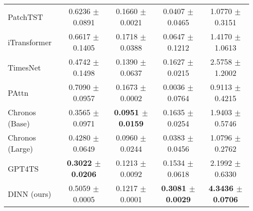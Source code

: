 {\begin{tabular}{lcccc}
PatchTST                             & 0.6236 $\pm$ 0.0891         & 0.1660 $\pm$ 0.0021         & 0.0407 $\pm$ 0.0465       & 1.0770 $\pm$ 0.3151          \\
iTransformer                         & 0.6617 $\pm$ 0.1405         & 0.1718 $\pm$ 0.0388         & 0.0647 $\pm$ 0.1212       & 1.4170 $\pm$ 1.0613          \\
TimesNet                             & 0.4742 $\pm$ 0.1498         & 0.1390 $\pm$ 0.0637         & 0.1627 $\pm$ 0.0215       & 2.5758 $\pm$ 1.2002          \\
PAttn                                & 0.7090 $\pm$ 0.0957         & 0.1673 $\pm$ 0.0002         & 0.0036 $\pm$ 0.0764       & 0.9113 $\pm$ 0.4215          \\
Chronos (Base)                       & 0.3565 $\pm$ 0.0971         & \textbf{0.0951 $\pm$ 0.0159}         & 0.1635 $\pm$ 0.0254       & 1.9403 $\pm$ 0.5746          \\
Chronos (Large)                      & 0.4280 $\pm$ 0.0649         & 0.0960 $\pm$ 0.0244         & 0.0383 $\pm$ 0.0456       & 1.0796 $\pm$ 0.2762          \\
GPT4TS                               & \textbf{0.3022 $\pm$ 0.0206}         & 0.1213 $\pm$ 0.0092         & 0.1534 $\pm$ 0.0618       & 2.1992 $\pm$ 0.6330          \\
DINN (ours)                          & 0.5059 $\pm$ \color[HTML]{00009B} 0.0005         & 0.1217 $\pm$ \color[HTML]{00009B} 0.0001         & \textbf{0.3081 $\pm$ \color[HTML]{00009B} 0.0029}       & \textbf{4.3436 $\pm$ \color[HTML]{00009B} 0.0706}          \\ \hline
\end{tabular}}